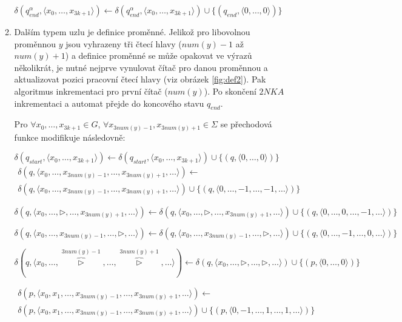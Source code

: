\documentclass[thesis=B,czech]{FITthesis}[2019/12/23]
\theoremstyle{definition}
\begin{document}
\begin{enumerate}
\begin{enumerate}
{		$\delta(q_{end}^{\alpha}, \langle  x_0, \dots, x_{3k+1}\rangle)\leftarrow\delta(q_{end}^{\alpha}, \langle  x_0, \dots, x_{3k+1}\rangle)\cup\{(q_{end}, \langle 0, \dots, 0\rangle)\} $

	}

	 \item \label{itm:def2}{Dalším typem uzlu je definice proměnné. Jelikož pro libovolnou proměnnou $y$ jsou vyhrazeny tři čtecí hlavy ($num(y)-1$ až $num(y)+1$) a definice proměnné se může opakovat ve výrazů několikrát, je nutné nejprve vynulovat čítač pro danou proměnnou a aktualizovat pozici pracovní čtecí hlavy (viz obrázek \ref{fig:def2}). Pak algoritmus  inkrementaci pro první čítač ($num(y)$). Po skončení $2NKA$  inkrementaci a automat přejde do koncového stavu $q_{end}$. 

	Pro  $\forall x_0, \dots, x_{3k+1} \in G$, $\forall x_{3num(y)-1}, x_{3num(y)+1} \in \Sigma$ se přechodová funkce modifikuje následovně:
	
	$\delta(q_{start}, \langle  x_0, \dots, x_{3k+1}\rangle)\leftarrow\delta(q_{start}, \langle  x_0, \dots, x_{3k+1}\rangle)\cup\{(q, \langle 0, \dots, 0\rangle)\}$
	 \begin{equation*}\begin{split}\delta(q, \langle  x_0, \dots, x_{3num(y)-1}, \dots, x_{3num(y)+1},\dots \rangle)\leftarrow\\\delta(q, \langle  x_0, \dots, x_{3num(y)-1}, \dots, x_{3num(y)+1},\dots \rangle)\cup\{(q, \langle 0, \dots, -1, \dots, -1, \dots\rangle)\}\end{split}\end{equation*}

	$\delta(q, \langle  x_0, \dots, \triangleright, \dots, x_{3num(y)+1},\dots \rangle)\leftarrow\delta(q, \langle  x_0, \dots, \triangleright, \dots, x_{3num(y)+1},\dots \rangle)\cup\{(q, \langle 0, \dots, 0, \dots, -1, \dots\rangle)\}$

	$\delta(q, \langle  x_0, \dots, x_{3num(y)-1}, \dots, \triangleright,\dots \rangle)\leftarrow\delta(q, \langle  x_0, \dots, x_{3num(y)-1}, \dots, \triangleright,\dots \rangle)\cup\{(q, \langle 0, \dots, -1, \dots, 0, \dots\rangle)\}$

	$\delta(q, \langle  x_0, \dots, \overbrace{\triangleright}^{3num(y)-1}, \dots, \overbrace{\triangleright}^{3num(y)+1},\dots \rangle)\leftarrow\delta(q, \langle  x_0, \dots, \triangleright, \dots, \triangleright,\dots \rangle)\cup\{(p, \langle 0, \dots, 0\rangle)\}$

	 \begin{equation*}\begin{split}\delta(p, \langle  x_0, x_1, \dots, x_{3num(y)-1}, \dots, x_{3num(y)+1},\dots \rangle)\leftarrow\\\delta(p, \langle  x_0, x_1, \dots, x_{3num(y)-1}, \dots, x_{3num(y)+1},\dots \rangle)\cup\{(p, \langle 0, -1, \dots, 1, \dots, 1, \dots\rangle)\}\end{split}\end{equation*}

}
\end{enumerate}
\end{enumerate}
\end{document}
